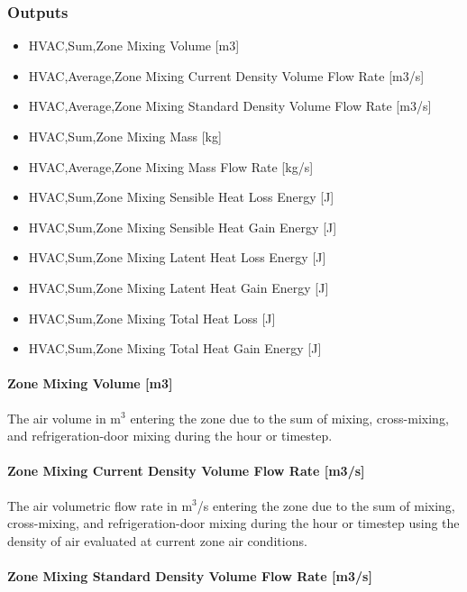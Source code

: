 \subsubsection{Outputs}\label{outputs-3-000}

\begin{itemize}
\item
  HVAC,Sum,Zone Mixing Volume {[}m3{]}
\item
  HVAC,Average,Zone Mixing Current Density Volume Flow Rate {[}m3/s{]}
\item
  HVAC,Average,Zone Mixing Standard Density Volume Flow Rate {[}m3/s{]}
\item
  HVAC,Sum,Zone Mixing Mass {[}kg{]}
\item
  HVAC,Average,Zone Mixing Mass Flow Rate {[}kg/s{]}
\item
  HVAC,Sum,Zone Mixing Sensible Heat Loss Energy {[}J{]}
\item
  HVAC,Sum,Zone Mixing Sensible Heat Gain Energy {[}J{]}
\item
  HVAC,Sum,Zone Mixing Latent Heat Loss Energy {[}J{]}
\item
  HVAC,Sum,Zone Mixing Latent Heat Gain Energy {[}J{]}
\item
  HVAC,Sum,Zone Mixing Total Heat Loss {[}J{]}
\item
  HVAC,Sum,Zone Mixing Total Heat Gain Energy {[}J{]}
\end{itemize}

\paragraph{Zone Mixing Volume {[}m3{]}}\label{zone-mixing-volume-m3}

The air volume in m\(^{3}\) entering the zone due to the sum of mixing, cross-mixing, and refrigeration-door mixing during the hour or timestep.

\paragraph{Zone Mixing Current Density Volume Flow Rate {[}m3/s{]}}\label{zone-mixing-current-density-volumetric-flow-rate-m3s}

The air volumetric flow rate in m\(^{3}\)/s entering the zone due to the sum of mixing, cross-mixing, and refrigeration-door mixing during the hour or timestep using the density of air evaluated at current zone air conditions.

\paragraph{Zone Mixing Standard Density Volume Flow Rate {[}m3/s{]}}\label{zone-mixing-standard-density-volumetric-flow-rate-m3s}

